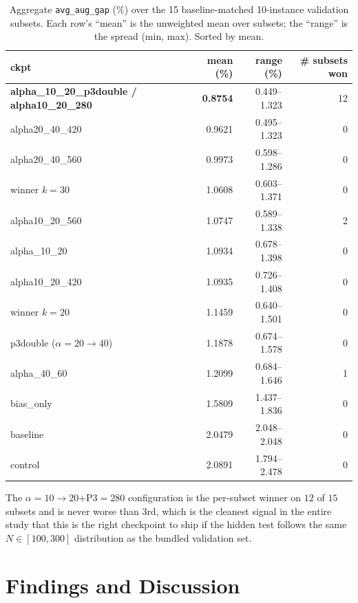 \documentclass[11pt,a4paper]{article}
\begin{document}
\begin{table}[t]
\centering
\caption{Aggregate \texttt{avg\_aug\_gap} ($\%$) over the 15
baseline-matched 10-instance validation subsets. Each row's ``mean'' is
the unweighted mean over subsets; the ``range'' is the spread (min, max).
Sorted by mean.}
\label{tab:robust}
\small
\begin{tabular}{l r r r}
\toprule
ckpt                      & mean (\%) & range (\%) & \# subsets won \\
\midrule
\rowcolor{sdmblue!10}
\textbf{alpha\_10\_20\_p3double / alpha10\_20\_280} & \textbf{0.8754} & 0.449--1.323 & 12 \\
alpha20\_40\_420          & 0.9621 & 0.495--1.323 & 0 \\
alpha20\_40\_560          & 0.9973 & 0.598--1.286 & 0 \\
winner $k\!=\!30$         & 1.0608 & 0.603--1.371 & 0 \\
alpha10\_20\_560          & 1.0747 & 0.589--1.338 & 2 \\
alpha\_10\_20             & 1.0934 & 0.678--1.398 & 0 \\
alpha10\_20\_420          & 1.0935 & 0.726--1.408 & 0 \\
winner $k\!=\!20$         & 1.1459 & 0.640--1.501 & 0 \\
p3double ($\alpha\!=\!20\!\to\!40$) & 1.1878 & 0.674--1.578 & 0 \\
alpha\_40\_60             & 1.2099 & 0.684--1.646 & 1 \\
bias\_only                & 1.5809 & 1.437--1.836 & 0 \\
\midrule
baseline                  & 2.0479 & 2.048--2.048 & 0 \\
control                   & 2.0891 & 1.794--2.478 & 0 \\
\bottomrule
\end{tabular}
\end{table}

The $\alpha\!=\!10\!\to\!20$+P3$=$280 configuration is the per-subset
winner on $12$ of $15$ subsets and is never worse than 3rd, which is the
cleanest signal in the entire study that this is the right checkpoint to
ship if the hidden test follows the same $N\!\in\![100,300]$ distribution
as the bundled validation set.

\section{Findings and Discussion}
\label{sec:findings}
\end{document}
